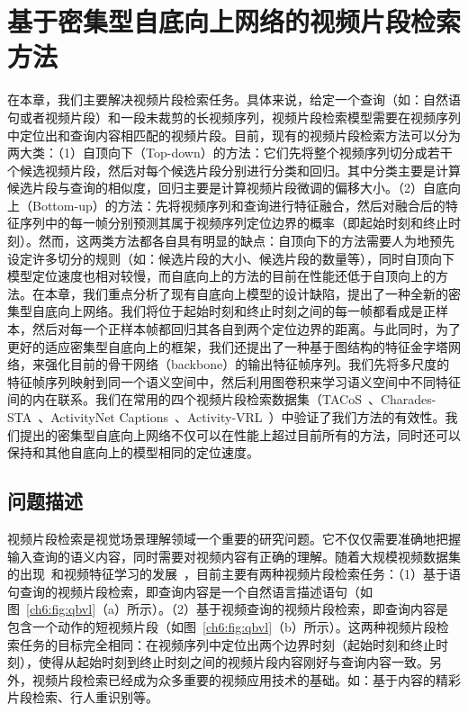 \chapter{基于密集型自底向上网络的视频片段检索方法}

在本章，我们主要解决视频片段检索任务。具体来说，给定一个查询（如：自然语句或者视频片段）和一段未裁剪的长视频序列，视频片段检索模型需要在视频序列中定位出和查询内容相匹配的视频片段。目前，现有的视频片段检索方法可以分为两大类：（1）自顶向下（Top-down）的方法：它们先将整个视频序列切分成若干个候选视频片段，然后对每个候选片段分别进行分类和回归。其中分类主要是计算候选片段与查询的相似度，回归主要是计算视频片段微调的偏移大小。（2）自底向上（Bottom-up）的方法：先将视频序列和查询进行特征融合，然后对融合后的特征序列中的每一帧分别预测其属于视频序列定位边界的概率（即起始时刻和终止时刻）。然而，这两类方法都各自具有明显的缺点：自顶向下的方法需要人为地预先设定许多切分的规则（如：候选片段的大小、候选片段的数量等），同时自顶向下模型定位速度也相对较慢，而自底向上的方法的目前在性能还低于自顶向上的方法。在本章，我们重点分析了现有自底向上模型的设计缺陷，提出了一种全新的密集型自底向上网络。我们将位于起始时刻和终止时刻之间的每一帧都看成是正样本，然后对每一个正样本帧都回归其各自到两个定位边界的距离。与此同时，为了更好的适应密集型自底向上的框架，我们还提出了一种基于图结构的特征金字塔网络，来强化目前的骨干网络（backbone）的输出特征帧序列。我们先将多尺度的特征帧序列映射到同一个语义空间中，然后利用图卷积来学习语义空间中不同特征间的内在联系。我们在常用的四个视频片段检索数据集（TACoS~\cite{regneri2013grounding}、Charades-STA~\cite{gao2017tall}、ActivityNet Captions~\cite{krishna2017dense}、Activity-VRL~\cite{feng2018video}）中验证了我们方法的有效性。我们提出的密集型自底向上网络不仅可以在性能上超过目前所有的方法，同时还可以保持和其他自底向上的模型相同的定位速度。
 

\section{问题描述}

视频片段检索是视觉场景理解领域一个重要的研究问题。它不仅仅需要准确地把握输入查询的语义内容，同时需要对视频内容有正确的理解。随着大规模视频数据集的出现~\cite{miech2019howto100m,monfort2018moments}和视频特征学习的发展~\cite{xu2019self}，目前主要有两种视频片段检索任务：（1）基于语句查询的视频片段检索，即查询内容是一个自然语言描述语句（如图~\ref{ch6:fig:qbvl}（a）所示）。（2）基于视频查询的视频片段检索，即查询内容是包含一个动作的短视频片段（如图~\ref{ch6:fig:qbvl}（b）所示）。这两种视频片段检索任务的目标完全相同：在视频序列中定位出两个边界时刻（起始时刻和终止时刻），使得从起始时刻到终止时刻之间的视频片段内容刚好与查询内容一致。另外，视频片段检索已经成为众多重要的视频应用技术的基础。如：基于内容的精彩片段检索、行人重识别等。

